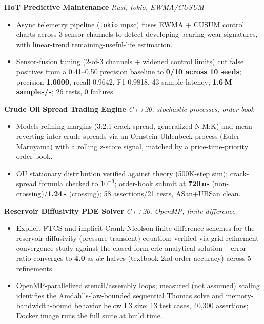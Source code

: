 \documentclass[10pt]{article}
\newcommand{\projectentry}[2]{%
  \noindent\textbf{#1} \hfill \textit{#2}\\[-0.3em]
}
\begin{document}
\projectentry{IIoT Predictive Maintenance}{Rust, tokio, EWMA/CUSUM}
\begin{itemize}
  \item Async telemetry pipeline (\texttt{tokio} mpsc) fuses EWMA + CUSUM control charts across 3 sensor channels to detect developing bearing-wear signatures, with linear-trend remaining-useful-life estimation.
  \item Sensor-fusion tuning (2-of-3 channels + widened control limits) cut false positives from a 0.41--0.50 precision baseline to \textbf{0/10 across 10 seeds}; precision \textbf{1.0000}, recall 0.9642, F1 0.9818, 43-sample latency; \textbf{1.6\,M samples/s}; 26 tests, 0 failures.
\end{itemize}

\projectentry{Crude Oil Spread Trading Engine}{C++20, stochastic processes, order book}
\begin{itemize}
  \item Models refining margins (3:2:1 crack spread, generalized N:M:K) and mean-reverting inter-crude spreads via an Ornstein-Uhlenbeck process (Euler-Maruyama) with a rolling z-score signal, matched by a price-time-priority order book.
  \item OU stationary distribution verified against theory (500K-step sim); crack-spread formula checked to $10^{-9}$; order-book submit at \textbf{720\,ns} (non-crossing)/\textbf{1.24\,\textmu s} (crossing); 58 assertions/21 tests, ASan+UBSan clean.
\end{itemize}

\projectentry{Reservoir Diffusivity PDE Solver}{C++20, OpenMP, finite-difference}
\begin{itemize}
  \item Explicit FTCS and implicit Crank-Nicolson finite-difference schemes for the reservoir diffusivity (pressure-transient) equation; verified via grid-refinement convergence study against the closed-form erfc analytical solution -- error ratio converges to \textbf{4.0} as $dx$ halves (textbook 2nd-order accuracy) across 5 refinements.
  \item OpenMP-parallelized stencil/assembly loops; measured (not assumed) scaling identifies the Amdahl's-law-bounded sequential Thomas solve and memory-bandwidth-bound behavior below L3 size; 13 test cases, 40{,}300 assertions; Docker image runs the full suite at build time.
\end{itemize}
\end{document}
